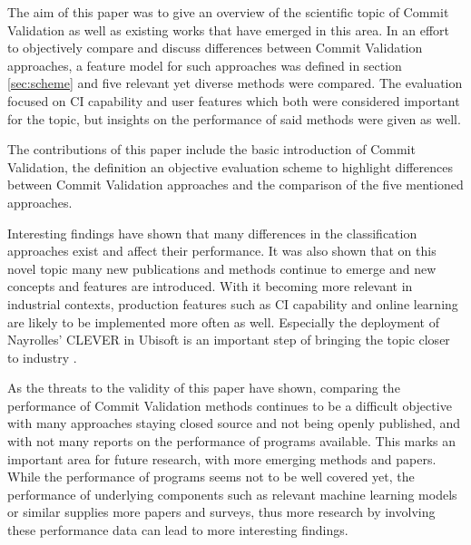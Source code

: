 

The aim of this paper was to give an overview of the scientific topic of Commit Validation as well as existing works that have emerged in this area. In an effort to objectively compare and discuss differences between Commit Validation approaches, a feature model for such approaches was defined in section \ref{sec:scheme} and five relevant yet diverse methods were compared. The evaluation focused on CI capability and user features which both were considered important for the topic, but insights on the performance of said methods were given as well.

The contributions of this paper include the basic introduction of Commit Validation, the definition an objective evaluation scheme to highlight differences between Commit Validation approaches and the comparison of the five mentioned approaches.

Interesting findings have shown that many differences in the classification approaches exist and affect their performance. It was also shown that on this novel topic many new publications and methods continue to emerge and new concepts and features are introduced. With it becoming more relevant in industrial contexts, production features such as CI capability and online learning are likely to be implemented more often as well. Especially the deployment of Nayrolles' CLEVER in Ubisoft is an important step of bringing the topic closer to industry \cite{Nayrolles2018}.

As the threats to the validity of this paper have shown, comparing the performance of Commit Validation methods continues to be a difficult objective with many approaches staying closed source and not being openly published, and with not many reports on the performance of programs available. This marks an important area for future research, with more emerging methods and papers. While the performance of programs seems not to be well covered yet, the performance of underlying components such as relevant machine learning models or similar supplies more papers and surveys, thus more research by involving these performance data can lead to more interesting findings.
